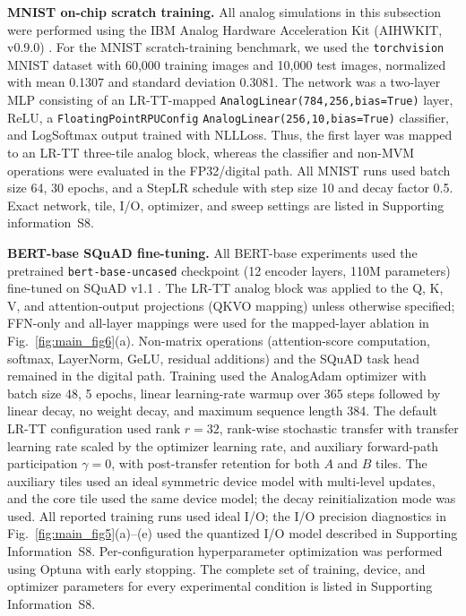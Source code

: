 \documentclass[AMA,LATO2COL]{WileyNJDv5}
\newcommand{\new}[1]{{\color{red}#1}}
\begin{document}
\noindent\textbf{MNIST on-chip scratch training.}
All analog simulations in this subsection were performed using the IBM Analog Hardware Acceleration Kit (AIHWKIT, v0.9.0) \cite{rasch2021aihwkit,legallo2023aihwkit}. For the MNIST scratch-training benchmark, we used the \texttt{torchvision} MNIST dataset with 60,000 training images and 10,000 test images, normalized with mean 0.1307 and standard deviation 0.3081. The network was a two-layer MLP consisting of an LR-TT-mapped \texttt{AnalogLinear(784,256,bias=True)} layer, ReLU, a \texttt{FloatingPointRPUConfig} \texttt{AnalogLinear(256,10,bias=True)} classifier, and LogSoftmax output trained with NLLLoss. Thus, the first layer was mapped to an LR-TT three-tile analog block, whereas the classifier and non-MVM operations were evaluated in the FP32/digital path. All MNIST runs used batch size 64, 30 epochs, and a StepLR schedule with step size 10 and decay factor 0.5. Exact network, tile, I/O, optimizer, and sweep settings are listed in Supporting information~S8.

\new{\noindent\textbf{BERT-base SQuAD fine-tuning.}
All BERT-base experiments used the pretrained \texttt{bert-base-uncased} checkpoint (12 encoder layers, 110M parameters) fine-tuned on SQuAD v1.1 \cite{devlin2019bert,rajpurkar2016squad}. The LR-TT analog block was applied to the Q, K, V, and attention-output projections (QKVO mapping) unless otherwise specified; FFN-only and all-layer mappings were used for the mapped-layer ablation in Fig.~\ref{fig:main_fig6}(a). Non-matrix operations (attention-score computation, softmax, LayerNorm, GeLU, residual additions) and the SQuAD task head remained in the digital path. Training used the AnalogAdam optimizer with batch size 48, 5 epochs, linear learning-rate warmup over 365 steps followed by linear decay, no weight decay, and maximum sequence length 384. The default LR-TT configuration used rank \(r=32\), rank-wise stochastic transfer with transfer learning rate scaled by the optimizer learning rate, and auxiliary forward-path participation \(\gamma=0\), with post-transfer retention for both \(A\) and \(B\) tiles. The auxiliary tiles used an ideal symmetric device model with multi-level updates, and the core tile used the same device model; the decay reinitialization mode was used. All reported training runs used ideal I/O; the I/O precision diagnostics in Fig.~\ref{fig:main_fig5}(a)--(e) used the quantized I/O model described in Supporting Information~S8. Per-configuration hyperparameter optimization was performed using Optuna with early stopping. The complete set of training, device, and optimizer parameters for every experimental condition is listed in Supporting Information~S8.}
\end{document}
